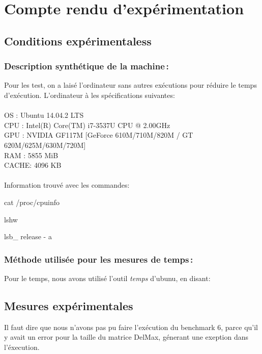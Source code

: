 \documentclass[a4paper, 10pt, french]{article}
\begin{document}
\section{Compte rendu d'expérimentation}
  \subsection{Conditions expérimentaless}

    \subsubsection{Description synthétique de la machine\,:} 
Pour les test, on a laisé l'ordinateur sans autres exécutions pour réduire le temps d'exécution. L'ordinateur à les spécifications suivantes:\\
\\
OS : Ubuntu 14.04.2 LTS \\
CPU : Intel(R) Core(TM) i7-3537U CPU @ 2.00GHz\\
GPU : NVIDIA GF117M [GeForce 610M/710M/820M / GT 620M/625M/630M/720M]\\
RAM : 5855 MiB\\
CACHE: 4096 KB\\
\\
Information trouvé avec les commandes: 

cat /proc/cpuinfo

lshw

lsb\_ release \-- a

    \subsubsection{Méthode utilisée pour les mesures de temps\,: } 
      Pour le temps, nous avons utilisé l'outil \textit{temps} d'ubunu, en disant:

  \subsection{Mesures expérimentales}

	Il faut dire que nous n'avons pas pu faire l'exécution du benchmark 6, parce qu'il y avait un error pour la taille du matrice DelMax, génerant une exeption dans l'éxecution.
\end{document}
